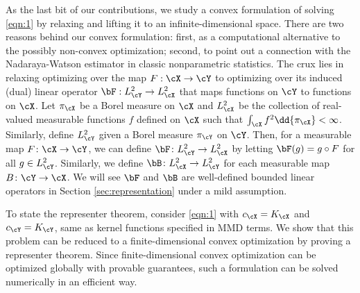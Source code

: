 \documentclass[11pt]{article}
\begin{document}
As the last bit of our contributions, we study a convex formulation of solving \eqref{eqn:1} by relaxing and lifting it to an infinite-dimensional space. There are two reasons behind our convex formulation: first, as a computational alternative to the possibly non-convex optimization; second, to point out a connection with the Nadaraya-Watson estimator in classic nonparametric statistics. The crux lies in relaxing optimizing over the map $F:\cX \rightarrow \cY$ to optimizing over its induced (dual) linear operator $\bF: L^2_\cY \rightarrow L^2_\cX$ that maps functions on $\cY$ to functions on $\cX$. Let $\pi_\cX$ be a Borel measure on $\cX$ and $L^2_{\cX}$ be the collection of real-valued measurable functions $f$ defined on $\cX$ such that $\int_{\cX} f^2 \dd{\pi_{\cX}} < \infty$. Similarly, define $L^2_{\cY}$ given a Borel measure $\pi_{\cY}$ on $\cY$. Then, for a measurable map $F \colon \cX \to \cY$, we can define $\bF \colon L^2_{\cY} \to L^2_{\cX}$ by letting $\bF(g) = g \circ F$ for all $g \in L^2_{\cY}$. Similarly, we define $\bB \colon L^2_{\cX} \to L^2_{\cY}$ for each measurable map $B \colon \cY \to \cX$. We will see $\bF$ and $\bB$ are well-defined bounded linear operators in Section \ref{sec:representation} under a mild assumption. 

To state the representer theorem, consider \eqref{eqn:1} with $c_{\cX} = K_{\cX}$ and $c_{\cY} = K_{\cY}$, same as kernel functions specified in MMD terms. We show that this problem can be reduced to a finite-dimensional convex optimization by proving a representer theorem. Since finite-dimensional convex optimization can be optimized globally with provable guarantees, such a formulation can be solved numerically in an efficient way.
\end{document}
